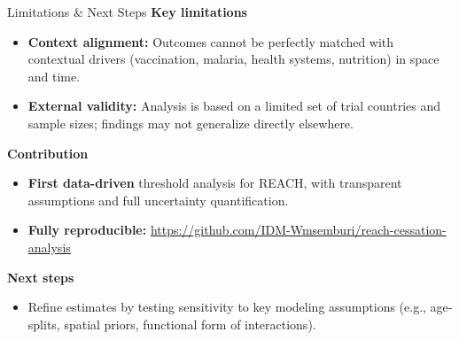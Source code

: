 \documentclass[aspectratio=169]{beamer}\usepackage[]{graphicx}\usepackage[dvipsnames]{xcolor}
\begin{document}
\begin{frame}{Limitations \& Next Steps}
\textbf{Key limitations}
\begin{itemize}
  \item \textbf{Context alignment:} Outcomes cannot be perfectly matched with contextual drivers (vaccination, malaria, health systems, nutrition) in space and time.
  \item \textbf{External validity:} Analysis is based on a limited set of trial countries and sample sizes; findings may not generalize directly elsewhere.
\end{itemize}

\vspace{0.35em}
\textbf{Contribution}
\begin{itemize}
  \item \textbf{First data-driven} threshold analysis for REACH, with transparent assumptions and full uncertainty quantification.
  \item \textbf{Fully reproducible:} \url{https://github.com/IDM-Wmsemburi/reach-cessation-analysis}
\end{itemize}

\vspace{0.35em}
\textbf{Next steps}
\begin{itemize}
  \item Refine estimates by testing sensitivity to key modeling assumptions (e.g., age-splits, spatial priors, functional form of interactions).
\end{itemize}
\end{frame}
\end{document}
